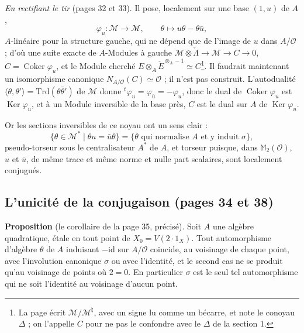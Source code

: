 \documentclass[11pt,a4paper]{article}
\begin{document}
\emph{En rectifiant le tir} (pages 32 et 33). Il pose, localement sur une base
$(1, u)$ de $A$,
\[
  \varphi_u : \mathcal{M} \to \mathcal{M}, \qquad \theta \longmapsto u\theta - \theta\bar{u},
\]
$A$-linéaire pour la structure gauche, qui ne dépend que de l'image de $u$ dans
$A/\mathcal{O}$ ; d'où une suite exacte de $A$-Modules à gauche
$\mathcal{M} \otimes \check{\Lambda} \to \mathcal{M} \to C \to 0$, $C = \operatorname{Coker}
\varphi_u$, et le Module cherché $E \otimes_A \check{E}^{\otimes_A -1} \simeq C$\footnote{La
page écrit $\mathcal{M}/\mathcal{M}^{\natural}$, avec un signe lu comme un bécarre, et
note le conoyau $\Delta$ ; on l'appelle $C$ pour ne pas le confondre avec le
$\Delta$ de la section 1.}. Il faudrait maintenant un isomorphisme canonique
$N_{A/\mathcal{O}}(C) \simeq \mathcal{O}$ ; il n'est pas construit. L'autodualité
$\langle\theta, \theta'\rangle = \mathrm{Trd}(\theta\bar{\theta}')$ de $\mathcal{M}$
donne ${}^{t}\varphi_u = \varphi_{\bar{u}} = -\varphi_u$, donc le dual de
$\operatorname{Coker}\varphi_u$ est $\operatorname{Ker}\varphi_u$, et à un Module inversible de
la base près, $C$ est le dual sur $A$ de $\operatorname{Ker}\varphi_u$.

Or les sections inversibles de ce noyau ont un sens clair :
\[
  \{\theta \in \mathcal{M}^{*} \mid \theta u = \bar{u}\theta\}
  = \{\theta \text{ qui normalise } A \text{ et y induit } \sigma\},
\]
pseudo-torseur sous le centralisateur $A^{*}$ de $A$, et torseur puisque, dans
$\mathbb{M}_2(\mathcal{O})$, $u$ et $\bar{u}$, de même trace et même norme et nulle
part scalaires, sont localement conjugués.

\subsection*{L'unicité de la conjugaison (pages 34 et 38)}

\textbf{Proposition} (le corollaire de la page 35, précisé). Soit $A$ une algèbre
quadratique, étale en tout point de
$X_0 = V(2\cdot 1_X)$. Tout automorphisme d'algèbre $\theta$ de $A$ induisant
$-\mathrm{id}$ sur $A/\mathcal{O}$ coïncide, au voisinage de chaque point, avec
l'involution canonique $\sigma$ ou avec l'identité, et le second cas ne se produit
qu'au voisinage de points où $2 = 0$. En particulier $\sigma$ est le seul tel
automorphisme qui ne soit l'identité au voisinage d'aucun point.
\end{document}
